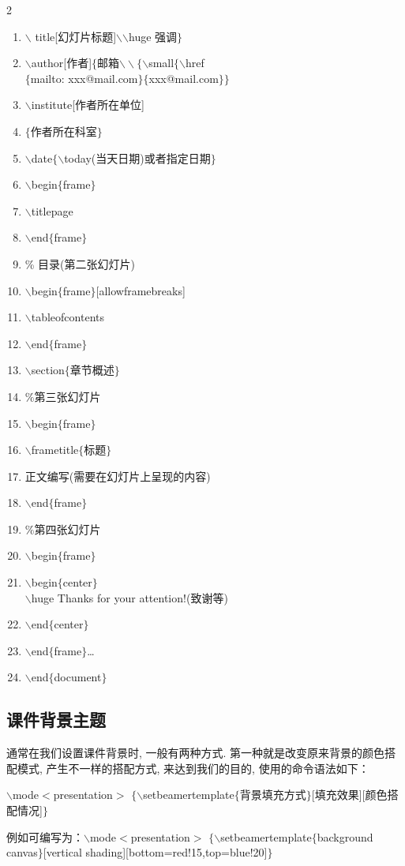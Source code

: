 \begin{multicols}{2}
\begin{enumerate}
\item$\backslash${} title[幻灯片标题]$\backslash$$\backslash$huge{} 强调$\}$
\item$\backslash$author[作者]$\{$邮箱$\backslash\backslash\{ \backslash$small$\{$$\backslash$href\\ \hspace*{-20pt}$\{$mailto: xxx@mail.com$\}\{$xxx@mail.com$\}\}$
\item$\backslash$institute[作者所在单位]
\item$\{$作者所在科室$\}$
\item$\backslash$date$\{$$\backslash$today(当天日期)或者指定日期$\}$
\item$\backslash$begin$\{$frame$\}$
\item$\backslash$titlepage
\item$\backslash$end$\{$frame$\}$
\item \% 目录(第二张幻灯片)
\item$\backslash$begin$\{$frame$\}$[allowframebreaks]
\item$\backslash$tableofcontents
\item$\backslash$end$\{$frame$\}$
\item$\backslash$section$\{$章节概述$\}$
\item$\%$第三张幻灯片
\item$\backslash$begin$\{$frame$\}$
\item$\backslash$frametitle$\{$标题$\}$
\item 正文编写(需要在幻灯片上呈现的内容)
\item$\backslash$end$\{$frame$\}$
\item$\%$第四张幻灯片
\item$\backslash$begin$\{$frame$\}$
\item$\backslash$begin$\{$center$\}$\\$\backslash$huge Thanks for your attention!(致谢等)
\item$\backslash$end$\{$center$\}$
\item$\backslash$end$\{$frame$\}$\ldots
\item$\backslash$end$\{$document$\}$
\end{enumerate}\vspace*{-10pt}
\end{multicols}
\vspace*{-30pt}

\subsection{课件背景主题}
通常在我们设置课件背景时, 一般有两种方式. 第一种就是改变原来背景的颜色搭配模式, 产生不一样的搭配方式, 来达到我们的目的, 使用的命令语法如下：
\centerline{
$\backslash$mode$<$presentation$>$
$\{\backslash$setbeamertemplate$\{$背景填充方式$\}$[填充效果][颜色搭配情况]$\}$}
例如可编写为：$\backslash$mode$<$presentation$>$
$\{\backslash$setbeamertemplate$\{$background canvas$\}$[vertical shad\-ing][bottom=red!15,top=blue!20]$\}$


